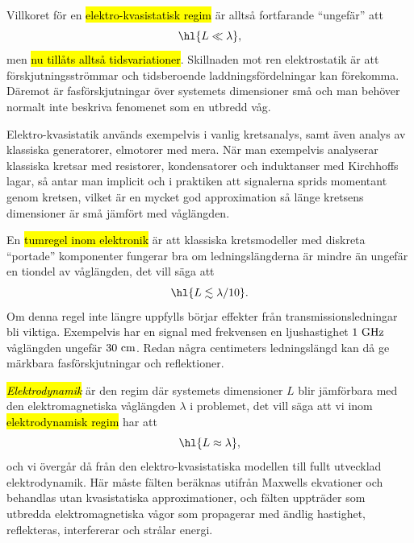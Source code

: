 {Villkoret f{\"o}r en {\hl{elektro-kvasistatisk regim}} {\"a}r allts{\aa}
fortfarande ``ungef{\"a}r'' att
$$
  \hl{L \ll \lambda},
$$
men {\hl{nu till{\aa}ts allts{\aa} tidsvariationer}}. Skillnaden mot ren
elektrostatik {\"a}r att f{\"o}rskjutningsstr{\"o}mmar och tidsberoende
laddningsf{\"o}rdelningar kan f{\"o}rekomma.
D{\"a}remot {\"a}r fasf{\"o}rskjutningar {\"o}ver systemets dimensioner sm{\aa}
och man beh{\"o}ver normalt inte beskriva fenomenet som en utbredd v{\aa}g.

Elektro-kvasistatik anv{\"a}nds exempelvis i vanlig kretsanalys, samt {\"a}ven
analys av klassiska generatorer, elmotorer med mera.
N{\"a}r man exempelvis analyserar klassiska kretsar med resistorer,
kondensatorer och induktanser med Kirchhoffs lagar, s{\aa} antar man implicit
och i praktiken att signalerna sprids momentant genom kretsen, vilket {\"a}r
en mycket god approximation s{\aa} l{\"a}nge kretsens dimensioner {\"a}r
sm{\aa} j{\"a}mf{\"o}rt med v{\aa}gl{\"a}ngden.

En {\hl{tumregel inom elektronik}} {\"a}r att klassiska kretsmodeller med
diskreta ``portade'' komponenter
fungerar bra om ledningsl{\"a}ngderna {\"a}r mindre {\"a}n ungef{\"a}r en
tiondel av v{\aa}gl{\"a}ngden, det vill s{\"a}ga att
$$
  \hl{L \lesssim {{\lambda}/{10}}}.
$$
Om denna regel inte l{\"a}ngre uppfylls b{\"o}rjar effekter fr{\aa}n
transmissionsledningar bli viktiga. Exempelvis har en signal med
frekvensen
en ljushastighet $1\ {\rm GHz}$ v{\aa}gl{\"a}ngden ungef{\"a}r
$30\ {\rm cm}$.
Redan n{\aa}gra centimeters ledningsl{\"a}ngd kan d{\aa} ge m{\"a}rkbara
fasf{\"o}rskjutningar och reflektioner.

{\it{\hl{Elektrodynamik}}} {\"a}r den regim d{\"a}r systemets dimensioner $L$
blir j{\"a}mf{\"o}rbara med den elektromagnetiska v{\aa}gl{\"a}ngden $\lambda$
i problemet, det vill s{\"a}ga att vi inom {\hl{elektrodynamisk regim}} har att
$$
  \hl{L\approx\lambda},
$$
och vi {\"o}verg{\aa}r d{\aa} fr{\aa}n den elektro-kvasistatiska modellen till
fullt utvecklad elektrodynamik.
H{\"a}r m{\aa}ste f{\"a}lten ber{\"a}knas utifr{\aa}n Maxwells ekvationer och
behandlas utan kvasistatiska approximationer, och f{\"a}lten upptr{\"a}der som
utbredda elektromagnetiska v{\aa}gor som propagerar med {\"a}ndlig hastighet,
reflekteras, interfererar och str{\aa}lar energi.

}
